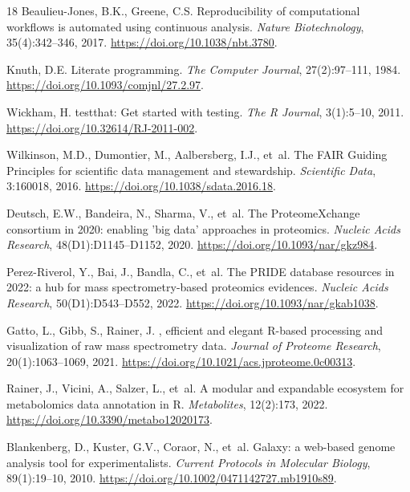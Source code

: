\documentclass[11pt,twoside,openright]{book}
\begin{document}
\begin{thebibliography}{18}
Beaulieu-Jones, B.K., Greene, C.S.
\newblock Reproducibility of computational workflows is automated using continuous analysis.
\newblock \emph{Nature Biotechnology}, 35(4):342--346, 2017.
\newblock \url{https://doi.org/10.1038/nbt.3780}.

Knuth, D.E.
\newblock Literate programming.
\newblock \emph{The Computer Journal}, 27(2):97--111, 1984.
\newblock \url{https://doi.org/10.1093/comjnl/27.2.97}.

Wickham, H.
\newblock testthat: Get started with testing.
\newblock \emph{The R Journal}, 3(1):5--10, 2011.
\newblock \url{https://doi.org/10.32614/RJ-2011-002}.

Wilkinson, M.D., Dumontier, M., Aalbersberg, I.J., et~al.
\newblock The {FAIR} Guiding Principles for scientific data management and stewardship.
\newblock \emph{Scientific Data}, 3:160018, 2016.
\newblock \url{https://doi.org/10.1038/sdata.2016.18}.

Deutsch, E.W., Bandeira, N., Sharma, V., et~al.
\newblock The {ProteomeXchange} consortium in 2020: enabling 'big data' approaches in proteomics.
\newblock \emph{Nucleic Acids Research}, 48(D1):D1145--D1152, 2020.
\newblock \url{https://doi.org/10.1093/nar/gkz984}.

Perez-Riverol, Y., Bai, J., Bandla, C., et~al.
\newblock The {PRIDE} database resources in 2022: a hub for mass spectrometry-based proteomics evidences.
\newblock \emph{Nucleic Acids Research}, 50(D1):D543--D552, 2022.
\newblock \url{https://doi.org/10.1093/nar/gkab1038}.

Gatto, L., Gibb, S., Rainer, J.
, efficient and elegant {R}-based processing and visualization of raw mass spectrometry data.
\newblock \emph{Journal of Proteome Research}, 20(1):1063--1069, 2021.
\newblock \url{https://doi.org/10.1021/acs.jproteome.0c00313}.

Rainer, J., Vicini, A., Salzer, L., et~al.
\newblock A modular and expandable ecosystem for metabolomics data annotation in {R}.
\newblock \emph{Metabolites}, 12(2):173, 2022.
\newblock \url{https://doi.org/10.3390/metabo12020173}.

Blankenberg, D., Kuster, G.V., Coraor, N., et~al.
\newblock Galaxy: a web-based genome analysis tool for experimentalists.
\newblock \emph{Current Protocols in Molecular Biology}, 89(1):19--10, 2010.
\newblock \url{https://doi.org/10.1002/0471142727.mb1910s89}.

\end{thebibliography}
\end{document}
